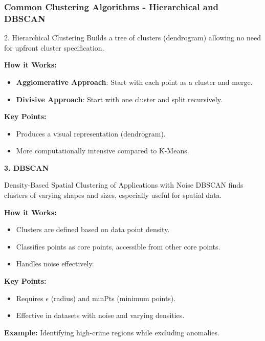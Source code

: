 \documentclass[aspectratio=169]{beamer}
\begin{document}
\begin{frame}[fragile]
    \frametitle{Common Clustering Algorithms - Hierarchical and DBSCAN}
    \begin{block}{2. Hierarchical Clustering}
        Builds a tree of clusters (dendrogram) allowing no need for upfront cluster specification.
    \end{block}
    
    \textbf{How it Works:}
    \begin{itemize}
        \item \textbf{Agglomerative Approach}: Start with each point as a cluster and merge.
        \item \textbf{Divisive Approach}: Start with one cluster and split recursively.
    \end{itemize}
    
    \textbf{Key Points:}
    \begin{itemize}
        \item Produces a visual representation (dendrogram).
        \item More computationally intensive compared to K-Means.
    \end{itemize}
    
    \textbf{3. DBSCAN}
    \begin{block}{Density-Based Spatial Clustering of Applications with Noise}
        DBSCAN finds clusters of varying shapes and sizes, especially useful for spatial data.
    \end{block}
    
    \textbf{How it Works:}
    \begin{itemize}
        \item Clusters are defined based on data point density.
        \item Classifies points as core points, accessible from other core points.
        \item Handles noise effectively.
    \end{itemize}
    
    \textbf{Key Points:}
    \begin{itemize}
        \item Requires $\epsilon$ (radius) and minPts (minimum points).
        \item Effective in datasets with noise and varying densities.
    \end{itemize}
    
    \textbf{Example:} Identifying high-crime regions while excluding anomalies.
\end{frame}
\end{document}
